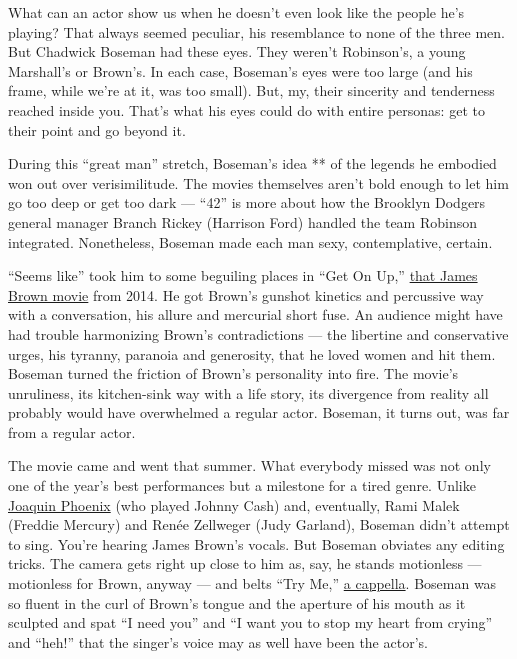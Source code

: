 What can an actor show us when he doesn't even look like the people he's
playing? That always seemed peculiar, his resemblance to none of the
three men. But Chadwick Boseman had these eyes. They weren't Robinson's,
a young Marshall's or Brown's. In each case, Boseman's eyes were too
large (and his frame, while we're at it, was too small). But, my, their
sincerity and tenderness reached inside you. That's what his eyes could
do with entire personas: get to their point and go beyond it.

During this ``great man'' stretch, Boseman's idea ** of the legends he
embodied won out over verisimilitude. The movies themselves aren't bold
enough to let him go too deep or get too dark --- ``42'' is more about
how the Brooklyn Dodgers general manager Branch Rickey (Harrison Ford)
handled the team Robinson integrated. Nonetheless, Boseman made each man
sexy, contemplative, certain.

``Seems like'' took him to some beguiling places in ``Get On Up,''
\href{https://grantland.com/features/guardians-of-the-galaxy-get-on-up-review/}{that
James Brown movie} from 2014. He got Brown's gunshot kinetics and
percussive way with a conversation, his allure and mercurial short fuse.
An audience might have had trouble harmonizing Brown's contradictions
--- the libertine and conservative urges, his tyranny, paranoia and
generosity, that he loved women and hit them. Boseman turned the
friction of Brown's personality into fire. The movie's unruliness, its
kitchen-sink way with a life story, its divergence from reality all
probably would have overwhelmed a regular actor. Boseman, it turns out,
was far from a regular actor.

The movie came and went that summer. What everybody missed was not only
one of the year's best performances but a milestone for a tired genre.
Unlike
\href{https://www.nytimes3xbfgragh.onion/2005/11/18/movies/the-man-in-black-on-stage-and-off.html}{Joaquin
Phoenix} (who played Johnny Cash) and, eventually, Rami Malek (Freddie
Mercury) and Renée Zellweger (Judy Garland), Boseman didn't attempt to
sing. You're hearing James Brown's vocals. But Boseman obviates any
editing tricks. The camera gets right up close to him as, say, he stands
motionless --- motionless for Brown, anyway --- and belts ``Try Me,''
\href{https://www.youtube.com/watch?v=_OIcuozqEjo}{a cappella}. Boseman
was so fluent in the curl of Brown's tongue and the aperture of his
mouth as it sculpted and spat ``I need you'' and ``I want you to stop my
heart from crying'' and ``heh!'' that the singer's voice may as well
have been the actor's.

